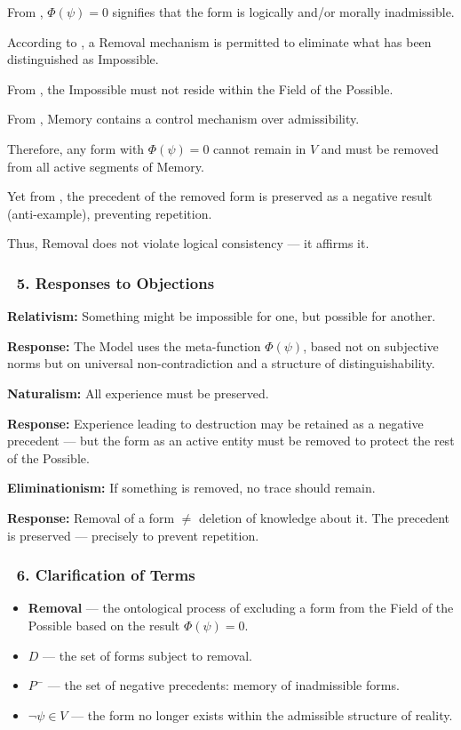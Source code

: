 \documentclass[12pt]{article}
\begin{document}
From \text{[11.1.1]}, $\Phi(\psi) = 0$ signifies that the form is logically and/or morally inadmissible.

According to \text{[10.3.3]}, a Removal mechanism is permitted to eliminate what has been distinguished as Impossible.

From \text{[4.3]}, the Impossible must not reside within the Field of the Possible.

From \text{[10.3]}, Memory contains a control mechanism over admissibility.

Therefore, any form with $\Phi(\psi) = 0$ cannot remain in $V$ and must be removed from all active segments of Memory.

Yet from \text{[11.10]}, the precedent of the removed form is preserved as a negative result (anti-example), preventing repetition.

Thus, Removal does not violate logical consistency — it affirms it.

\subsubsection*{🔹 5. Responses to Objections}

\textbf{Relativism:}
Something might be impossible for one, but possible for another.

\textbf{Response:}
The Model uses the meta-function $\Phi(\psi)$, based not on subjective norms but on universal non-contradiction and a structure of distinguishability.

\bigskip

\textbf{Naturalism:}
All experience must be preserved.

\textbf{Response:}
Experience leading to destruction may be retained as a negative precedent — but the form as an active entity must be removed to protect the rest of the Possible.

\bigskip

\textbf{Eliminationism:}
If something is removed, no trace should remain.

\textbf{Response:}
Removal of a form $\neq$ deletion of knowledge about it. The precedent is preserved — precisely to prevent repetition.

\subsubsection*{🔹 6. Clarification of Terms}

\begin{itemize}
\item \textbf{Removal} — the ontological process of excluding a form from the Field of the Possible based on the result $\Phi(\psi) = 0$.
\item $D$ — the set of forms subject to removal.
\item $P^-$ — the set of negative precedents: memory of inadmissible forms.
\item $\neg\psi \in V$ — the form no longer exists within the admissible structure of reality.
\end{itemize}
\end{document}
